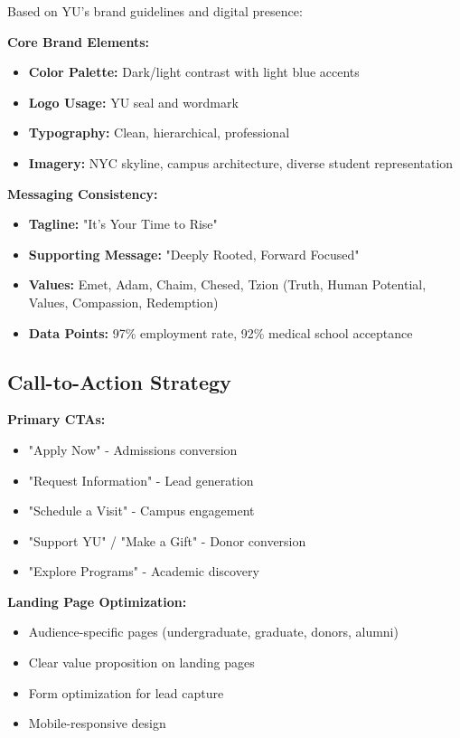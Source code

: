 \documentclass[12pt,letterpaper]{article}
\begin{document}
Based on YU's brand guidelines and digital presence:

\textbf{Core Brand Elements:}
\begin{itemize}[leftmargin=*]
    \item \textbf{Color Palette:} Dark/light contrast with light blue accents
    \item \textbf{Logo Usage:} YU seal and wordmark
    \item \textbf{Typography:} Clean, hierarchical, professional
    \item \textbf{Imagery:} NYC skyline, campus architecture, diverse student representation
\end{itemize}

\textbf{Messaging Consistency:}
\begin{itemize}[leftmargin=*]
    \item \textbf{Tagline:} "It's Your Time to Rise"
    \item \textbf{Supporting Message:} "Deeply Rooted, Forward Focused"
    \item \textbf{Values:} Emet, Adam, Chaim, Chesed, Tzion (Truth, Human Potential, Values, Compassion, Redemption)
    \item \textbf{Data Points:} 97\% employment rate, 92\% medical school acceptance
\end{itemize}

\subsection{Call-to-Action Strategy}

\textbf{Primary CTAs:}
\begin{itemize}[leftmargin=*]
    \item "Apply Now" - Admissions conversion
    \item "Request Information" - Lead generation
    \item "Schedule a Visit" - Campus engagement
    \item "Support YU" / "Make a Gift" - Donor conversion
    \item "Explore Programs" - Academic discovery
\end{itemize}

\textbf{Landing Page Optimization:}
\begin{itemize}[leftmargin=*]
    \item Audience-specific pages (undergraduate, graduate, donors, alumni)
    \item Clear value proposition on landing pages
    \item Form optimization for lead capture
    \item Mobile-responsive design
\end{itemize}
\end{document}
